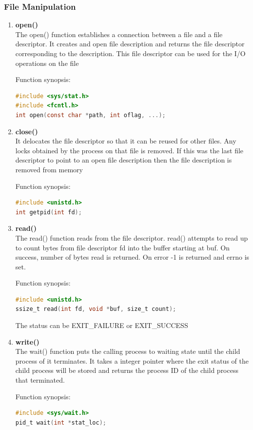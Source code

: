 \subsubsection{File Manipulation}
\begin{enumerate}
	\item \textbf{open()} \\
	The open() function establishes a connection between a file and a file descriptor. It creates and
	open file description and returns the file descriptor corresponding to the description. This file 
	descriptor can be used for the I/O operations on the file

	Function synopsis:
	\begin{lstlisting}[language=C]
#include <sys/stat.h>
#include <fcntl.h>
int open(const char *path, int oflag, ...);
	\end{lstlisting}

	\item \textbf{close()} \\
	It delocates the file descriptor so that it can be reused for other files. Any locks obtained by the 
	process on that file is removed. If this was the last file descriptor to point to an open file description
	then the file description is removed from memory

	Function synopsis:
	\begin{lstlisting}[language=C]
#include <unistd.h>
int getpid(int fd);
	\end{lstlisting}

	\item \textbf{read()} \\
	The read() function reads from the file descriptor. read() attempts to read up to count bytes from 
	file descriptor fd into the buffer starting at buf. On success, number of bytes read is returned. On error
	-1 is returned and errno is set.

	Function synopsis:
	\begin{lstlisting}[language=C]
#include <unistd.h>
ssize_t read(int fd, void *buf, size_t count);
	\end{lstlisting}

	The status can be EXIT\_FAILURE or EXIT\_SUCCESS

	\item \textbf{write()} \\
	The wait() function puts the calling process to waiting state until the child process of
	it terminates. It takes a integer pointer where the exit status of the child process will 
	be stored and returns the process ID of the child process that terminated.

	Function synopsis:
	\begin{lstlisting}[language=C]
#include <sys/wait.h>
pid_t wait(int *stat_loc);
	\end{lstlisting}
\end{enumerate}


